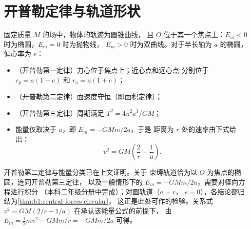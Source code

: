 \section{开普勒定律与轨道形状}

\begin{theorem}[牛顿场中的轨迹]\label{thm:b1:central-forces:conics}
固定质量 $M$ 的场中，物体的轨迹为圆锥曲线，
且 $O$ 位于其一个焦点上：$E_m < 0$ 时为椭圆，$E_m = 0$ 时为抛物线，
$E_m > 0$ 时为双曲线。对于半长轴为 $a$ 的椭圆，
偏心率为 $e$：
\begin{itemize}
  \item （开普勒第一定律）力心位于焦点上；近心点和远心点
        分别位于 $r_p = a(1 - e)$ 和 $r_a = a(1 + e)$；
  \item （开普勒第二定律）面速度守恒（即面积定律）；
  \item （开普勒第三定律）周期满足 $T^2 = 4\pi^2a^3/GM$；
  \item 能量仅取决于 $a$，即 $E_m = -GMm/2a$，于是
        距离为 $r$ 处的速率由下式给出：
        \[
        v^2 = GM\left(\frac{2}{r} - \frac{1}{a}\right) .
        \]
\end{itemize}
\end{theorem}
\admitted

\begin{remark}[已证明与承认的内容]\label{rem:b1:central-forces:admitted}
开普勒第二定律与能量分类已在上文证明。关于
束缚轨道恰为以 $O$ 为焦点的椭圆，连同开普勒第三定律，
以及一般情形下的 $E_m = -GMm/2a$，需要对径向方程进行积分
（本科二年级分册中完成）；对圆轨道（$a = r$，
$e = 0$），各结论都归结为\cref{thm:b1:central-forces:circular}，
这正是此处可作的检验。关系式 $v^2 = GM(2/r - 1/a)$
在承认该能量公式的前提下，
由 $E_m = \tfrac12 mv^2 - GMm/r = -GMm/2a$ 可得。
\end{remark}

